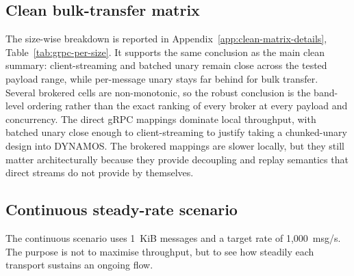 \subsection{Clean bulk-transfer matrix}

The size-wise breakdown is reported in Appendix~\ref{app:clean-matrix-details}, Table~\ref{tab:grpc-per-size}. It supports the same conclusion as the main clean summary: client-streaming and batched unary remain close across the tested payload range, while per-message unary stays far behind for bulk transfer. Several brokered cells are non-monotonic, so the robust conclusion is the band-level ordering rather than the exact ranking of every broker at every payload and concurrency. The direct gRPC mappings dominate local throughput, with batched unary close enough to client-streaming to justify taking a chunked-unary design into DYNAMOS. The brokered mappings are slower locally, but they still matter architecturally because they provide decoupling and replay semantics that direct streams do not provide by themselves.

\subsection{Continuous steady-rate scenario}

The continuous scenario uses 1~KiB messages and a target rate of 1{,}000~msg/s. The purpose is not to maximise throughput, but to see how steadily each transport sustains an ongoing flow.

